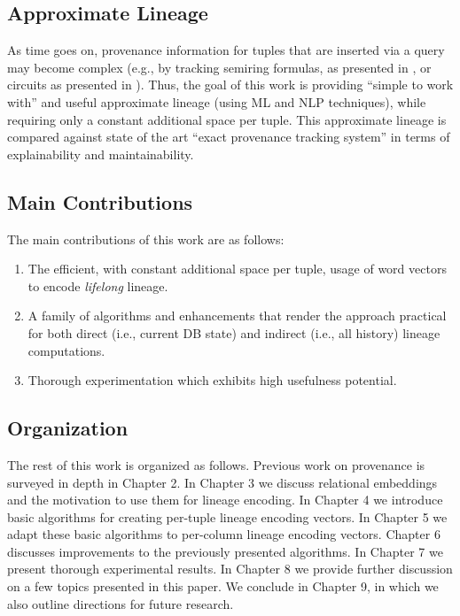 \subsection*{Approximate Lineage}
As time goes on, provenance information for tuples that are inserted via a query may become complex (e.g., by tracking semiring formulas, as presented in \cite{green2007provenance}, or circuits as presented  in \cite{Deutch2014, Senellart2017}). Thus, the goal of this work is providing ``simple to work with'' and useful approximate lineage (using ML and NLP techniques), while requiring only a constant additional space per tuple. This approximate lineage is compared against state of the art ``exact provenance tracking system'' in terms of explainability and maintainability.\\


\subsection*{Main Contributions}
\par The main contributions of this work are as follows:
\begin{enumerate}
    \item The efficient, with constant additional space per tuple, usage of word vectors to encode \textit{lifelong} lineage.
    \item A family of algorithms and enhancements that render the approach practical for both direct (i.e., current DB state) and indirect (i.e., all history) lineage computations.
    \item Thorough experimentation which exhibits high usefulness potential.
\end{enumerate}


\subsection*{Organization}
The rest of this work is organized as follows.
Previous work on provenance is surveyed in depth in Chapter 2.
In Chapter 3 we discuss relational embeddings and the motivation to use them for lineage encoding.
In Chapter 4 we introduce basic algorithms for creating per-tuple lineage encoding vectors.
In Chapter 5 we adapt these basic algorithms to per-column lineage encoding vectors.
Chapter 6 discusses improvements to the previously presented algorithms.
In Chapter 7 we present thorough experimental results.
In Chapter 8 we provide further discussion on a few topics presented in this paper.
We conclude in Chapter 9, in which we also outline directions for future research.

